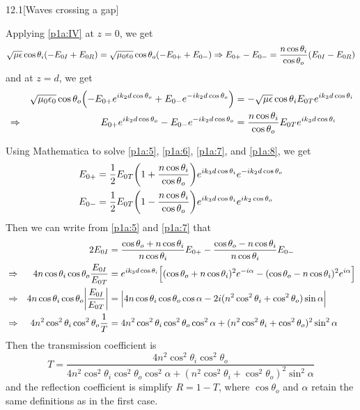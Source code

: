 \documentclass[12pt]{article}
\begin{document}
\begin{problem}{12.1}[Waves crossing a gap]
\begin{solution}
Applying \eqref{p1a:IV} at $z=0$, we get
\begin{equation}\label{p1a:7}
    \sqrt{\mu\epsilon}\cos\theta_i(-E_{0I}+E_{0R})
    =\sqrt{\mu_0\epsilon_0}\cos\theta_o\qty(-E_{0+}+E_{0-})
    \Rightarrow
    E_{0+}-E_{0-}=\frac{n\cos\theta_i}{\cos\theta_o}\qty(E_{0I}-E_{0R})
\end{equation}
and at $z=d$, we get
\begin{align}\label{p1a:8}
    &&\sqrt{\mu_0\epsilon_0}\cos\theta_o\qty(-E_{0+}e^{ik_2d\cos\theta_o}+E_{0-}e^{-ik_2d\cos\theta_o})
    &=-\sqrt{\mu\epsilon}\cos\theta_iE_{0T}e^{ik_3d\cos\theta_i}\notag\\
    &\Rightarrow&
    E_{0+}e^{ik_2d\cos\theta_o}-E_{0-}e^{-ik_2d\cos\theta_o}
    &=\frac{n\cos\theta_i}{\cos\theta_o}E_{0T}e^{ik_3d\cos\theta_i}
\end{align}

Using Mathematica to solve \eqref{p1a:5}, \eqref{p1a:6}, \eqref{p1a:7}, and
\eqref{p1a:8}, we get
\begin{subequations}
    \begin{align}
        E_{0+}&=\frac12E_{0T}\qty(1+\frac{n\cos\theta_i}{\cos\theta_o})e^{ik_3d\cos\theta_i}e^{-ik_2d\cos\theta_o}\\ 
        E_{0-}&=\frac12E_{0T}\qty(1-\frac{n\cos\theta_i}{\cos\theta_o})
        e^{ik_3d\cos\theta_i}e^{ik_2\cos\theta_o}
    \end{align} 
\end{subequations}
Then we can write from \eqref{p1a:5} and \eqref{p1a:7} that
\begin{align}
    &&2E_{0I}&=\frac{\cos\theta_o+n\cos\theta_i}{n\cos\theta_i}E_{0+}
    -\frac{\cos\theta_o-n\cos\theta_i}{n\cos\theta_i}E_{0-}\notag\\
    &\Rightarrow&
    4n\cos\theta_i\cos\theta_o\frac{E_{0I}}{E_{0T}}
    &=e^{ik_3d\cos\theta_i}\qty[(\cos\theta_o+n\cos\theta_i)^2e^{-i\alpha}-(\cos\theta_o-n\cos\theta_i)^2e^{i\alpha}]\notag\\
    &\Rightarrow&
    4n\cos\theta_i\cos\theta_o\abs{\frac{E_{0I}}{E_{0T}}}&=
\abs{4n\cos\theta_i\cos\theta_o\cos\alpha-2i(n^2\cos^2\theta_i+\cos^2\theta_o)\sin\alpha}\notag\\
    &\Rightarrow&
    4n^2\cos^2\theta_i\cos^2\theta_o\frac1T
    &=4n^2\cos^2\theta_i\cos^2\theta_o\cos^2\alpha
    +(n^2\cos^2\theta_i+\cos^2\theta_o)^2\sin^2\alpha
\end{align}
Then the transmission coefficient is
\begin{equation}\label{p1a:T}
    T=\frac{4n^2\cos^2\theta_i\cos^2\theta_o}{4n^2\cos^2\theta_i\cos^2\theta_o\cos^2\alpha+(n^2\cos^2\theta_i+\cos^2\theta_o)^2\sin^2\alpha} 
\end{equation}
and the reflection coefficient is simplify $R=1-T$, where $\cos\theta_o$ and
$\alpha$ retain the same definitions as in the first case.


\end{solution}
\end{problem}
\end{document}
